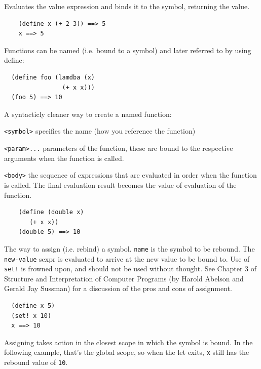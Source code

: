 \documentclass[12pt]{article}
\begin{document}

Evaluates the value expression and binds it to the symbol, returning
the value. 

\begin{verbatim}
    (define x (+ 2 3)) ==> 5
    x ==> 5
\end{verbatim}

Functions can be named (i.e. bound to a symbol) and later referred to
by using define:

\begin{verbatim}
  (define foo (lamdba (x) 
                (+ x x)))
  (foo 5) ==> 10  
\end{verbatim}



A syntacticly cleaner way to create a named function:

\verb|<symbol>| specifies the name (how you reference the function)

\verb|<param>...| parameters of the function, these are bound to the
respective arguments when the function is called. 

\verb|<body>| the sequence of expressions that are evaluated in order
when the function is called. The final evaluation result becomes the
value of evaluation of the function. 

\begin{verbatim}
    (define (double x)
       (+ x x))
    (double 5) ==> 10
\end{verbatim}


The way to assign (i.e. rebind) a symbol. \verb|name| is the symbol to be rebound. The \verb|new-value| sexpr is
evaluated to arrive at the new value to be bound to. Use of
\verb|set!| is frowned upon, and should not be used without thought.
See Chapter 3 of Structure and Interpretation of Computer Programs (by
Harold Abelson and Gerald Jay Sussman) for a discussion of the pros
and cons of assignment.

\begin{verbatim}
  (define x 5)
  (set! x 10)
  x ==> 10
\end{verbatim}

Assigning takes action in the closest scope in which the symbol is
bound. In the following example, that's the global scope, so when the
let exits, \verb|x| still has the rebound value of \verb|10|.
\end{document}
